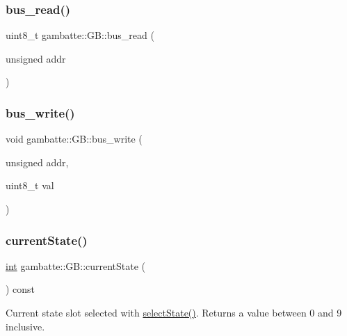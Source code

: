 \subsubsection{\texorpdfstring{bus\+\_\+read()}{bus\_read()}}
{\footnotesize\ttfamily uint8\+\_\+t gambatte\+::\+G\+B\+::bus\+\_\+read (\begin{DoxyParamCaption}\item[{unsigned}]{addr }\end{DoxyParamCaption})}

\mbox{\label{classgambatte_1_1GB_a060622967acdfc0ff693dedc39d9d187}} 
\subsubsection{\texorpdfstring{bus\+\_\+write()}{bus\_write()}}
{\footnotesize\ttfamily void gambatte\+::\+G\+B\+::bus\+\_\+write (\begin{DoxyParamCaption}\item[{unsigned}]{addr,  }\item[{uint8\+\_\+t}]{val }\end{DoxyParamCaption})}

\mbox{\label{classgambatte_1_1GB_a48d11dcf693f45ab861f640d8fa96dc9}} 
\subsubsection{\texorpdfstring{current\+State()}{currentState()}}
{\footnotesize\ttfamily \hyperlink{ioapi_8h_a787fa3cf048117ba7123753c1e74fcd6}{int} gambatte\+::\+G\+B\+::current\+State (\begin{DoxyParamCaption}{ }\end{DoxyParamCaption}) const}

Current state slot selected with \hyperlink{classgambatte_1_1GB_a231371a6ef7aa0001afa45d645052569}{select\+State()}. Returns a value between 0 and 9 inclusive. \mbox{\label{classgambatte_1_1GB_a5d93be3dc403febfd05f65987fffbd96}} 
